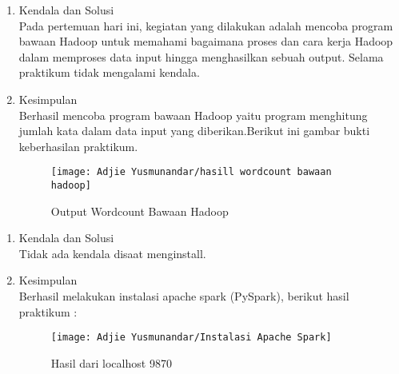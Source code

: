 \begin{enumerate}
\item Kendala dan Solusi \\
Pada pertemuan hari ini, kegiatan yang dilakukan adalah mencoba program bawaan Hadoop untuk memahami bagaimana
proses dan cara kerja Hadoop dalam memproses data input hingga menghasilkan sebuah output. Selama praktikum tidak mengalami kendala.

\item Kesimpulan\\
Berhasil mencoba program bawaan Hadoop yaitu program menghitung jumlah kata dalam data input yang diberikan.Berikut ini gambar bukti keberhasilan praktikum. 

\begin{figure}
\texttt{[image: Adjie Yusmunandar/hasill wordcount bawaan hadoop]}
\caption{Output Wordcount Bawaan Hadoop}
\label{gam:WordCount bawaan-Hadoop}
\end{figure}

\end{enumerate}

\begin{enumerate}
\item Kendala dan Solusi \\
Tidak ada kendala disaat menginstall.

\item Kesimpulan\\
Berhasil melakukan instalasi apache spark (PySpark), berikut hasil praktikum :

\begin{figure}
\texttt{[image: Adjie Yusmunandar/Instalasi Apache Spark]}
\caption{Hasil dari localhost 9870}
\label{gam:hasil konfigurasi hadoop}
\end{figure}
\end{enumerate}